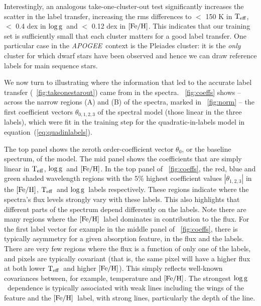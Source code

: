\documentclass[12pt, preprint]{aastex}
\newcommand{\teff}{\mbox{$\rm T_{eff}$}}
\newcommand{\feh}{\mbox{$\rm [Fe/H]$}}
\newcommand{\logg}{\mbox{$\rm \log g$}}
\newcommand{\apogee}{\textsl{APOGEE}}
\begin{document}
Interestingly, an analogous take-one-cluster-out test significantly increases the scatter in the label transfer, 
increasing the rms differences to $<$ 150 K in \teff, $<$ 0.4 dex in \logg\ and $<$ 0.12 dex in \feh.
This indicates that our training set is sufficiently small that each cluster matters for a good label transfer. 
One particular case in the \apogee\ context is the Pleiades cluster: it is the \textit{only} cluster for which dwarf stars have been observed and hence we can draw reference labels for main sequence stars. 
 
We now turn to illustrating where the information that led to the accurate label transfer (\figurename~\ref{fig:takeonestarout}) came from in the spectra.
\figurename~\ref{fig:coeffs} shows -- across the narrow regions (A) and (B) of the spectra, marked in \figurename~\ref{fig:norm} -- the first coefficient vectors $\theta_{0,1,2,3}$ of the spectral model (those linear in the three labels), which were fit in the training step for the quadratic-in-labels model in equation~(\ref{eq:quadinlabels}). 


The top panel shows the zeroth order-coefficient vector $\theta_0$, or the baseline spectrum, of the model. 
The mid panel shows the coefficients that are simply linear in \teff, \logg\ and \feh.
In the top panel of \figurename~\ref{fig:coeffs}, the red, blue and green shaded wavelength regions with the 5\% 
highest coefficient values $|\theta_{1,2,3}|$ in the \feh, \teff\ and \logg\ labels respectively. 
These regions indicate where the spectra's flux levels strongly vary with these labels.
This also highlights that different parts of the spectrum depend differently on the labels. Note there are many regions where the \feh\ label dominates in contribution to the flux.
For the first label vector for example in the middle panel of \figurename~\ref{fig:coeffs}, 
there is typically asymmetry for a given absorption feature, in the flux and the labels. 
There are very few regions where the flux is a function of only one of the labels, and pixels are typically covariant 
(that is, the same pixel will have a higher flux at both lower \teff\ and higher \feh). 
This simply reflects well-known covariances between, for example, temperature and \feh .
The strongest \logg\ dependence is typically associated with weak lines including the wings of the 
feature and the \feh\ label, with strong lines, particularly the depth of the line. 
\end{document}
